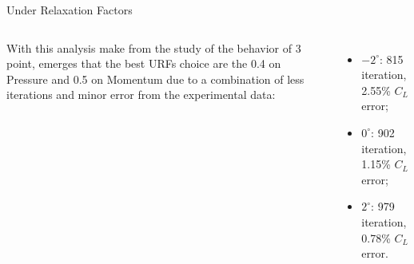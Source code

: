 \documentclass[english,10pt,a4paper,twoside]{beamer}
\begin{document}
\begin{frame}[shrink=55]{Under Relaxation Factors}
\begin{columns}[T]
			
			With this analysis make from the study of the behavior of 3 point, emerges that the best URFs choice are the 0.4 on Pressure and 0.5 on Momentum due to a combination of less iterations and minor error from the experimental data: \begin{itemize}
				\item $-2^\circ$: 815 iteration, 2.55\% $C_L$ error;
				\item $0^\circ$: 902 iteration, 1.15\% $C_L$ error;
				\item $2^\circ$:  979 iteration, 0.78\% $C_L$ error.
			\end{itemize}
		
	\end{columns}	
		
		
	\end{frame}
	
\end{document}
